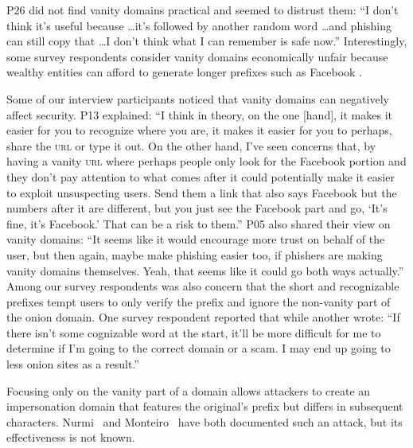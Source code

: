 P26 did not find vanity domains practical and seemed to distrust them: ``I don't
think it's useful because \ldots it's followed by another random word \ldots and
phishing can still copy that \ldots I don't think what I can remember is safe
now.''  Interestingly, some  survey respondents consider vanity
domains economically unfair because wealthy entities can afford to generate
longer prefixes such as Facebook .

Some of our interview participants noticed that vanity domains can negatively
affect security.  P13 explained: ``I think in theory, on the one [hand], it
makes it easier for you to recognize where you are, it makes it easier for you
to perhaps, share the \textsc{url} or type it out.  On the other hand, I've seen
concerns that, by having a vanity \textsc{url} where perhaps people only look
for the Facebook portion and they don't pay attention to what comes after it
could potentially make it easier to exploit unsuspecting users. Send them a link
that also says Facebook but the numbers after it are different, but you just see
the Facebook part and go, `It's fine, it's Facebook.' That can be a risk to
them.''  P05 also shared their view on vanity domains: ``It seems like it would
encourage more trust on behalf of the user, but then again, maybe make phishing
easier too, if phishers are making vanity domains themselves.  Yeah, that seems
like it could go both ways actually.''  
Among our survey respondents was also concern that the short and recognizable
prefixes tempt users to only verify the prefix and ignore the non-vanity part of
the onion domain.  One survey respondent reported that   while another
wrote: ``If there isn't some cognizable word at the start, it'll be more
difficult for me to determine if I'm going to the correct domain or a scam. I
may end up going to less onion sites as a result.'' 

Focusing only on the vanity part of a domain allows attackers to create an
impersonation domain that features the original's prefix but differs in
subsequent characters.  Nurmi~\cite{Nurmi2015a} and
Monteiro~\cite{Monteiro2016a} have both documented such an attack, but its
effectiveness is not known.

